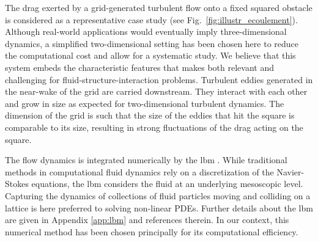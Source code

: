 \documentclass{jfm}
\newcommand{\EL}[1]{{\color{myred}{#1}}}
\begin{document}
%
The drag exerted by a grid-generated turbulent flow onto a fixed squared obstacle is considered as a representative case study (see Fig.~\ref{fig:illustr_ecoulement}). 
%
Although real-world applications would eventually imply three-dimensional dynamics, a simplified two-dimensional setting has been chosen here to reduce the computational cost and allow for a systematic study. 
% 
We believe that this system embeds the characteristic features that makes 
 \EL{this study} both relevant and challenging for fluid-structure-interaction problems. 
%
Turbulent eddies generated in the near-wake of the grid are carried downstream.
They interact with each other and grow in size as expected for two-dimensional turbulent dynamics. 
The dimension of the grid is such that the size of the eddies that hit the square is comparable to its size, resulting in strong fluctuations of the drag acting on the square. 
%
%
%

%
The flow dynamics is integrated numerically by the \ac{lbm} \EL{\citep{kruger_lattice_2017}}. 
While traditional methods in computational fluid dynamics rely on a discretization of the Navier-Stokes equations, the \ac{lbm} considers the fluid at an underlying  mesoscopic level.
Capturing the dynamics of collections of fluid particles moving and colliding on a lattice is here preferred to solving non-linear PDEs. 
Further details about the \ac{lbm} are given in Appendix \ref{app:lbm} and references therein.
In our context, this numerical method has been chosen principally for its computational efficiency. 
\end{document}
